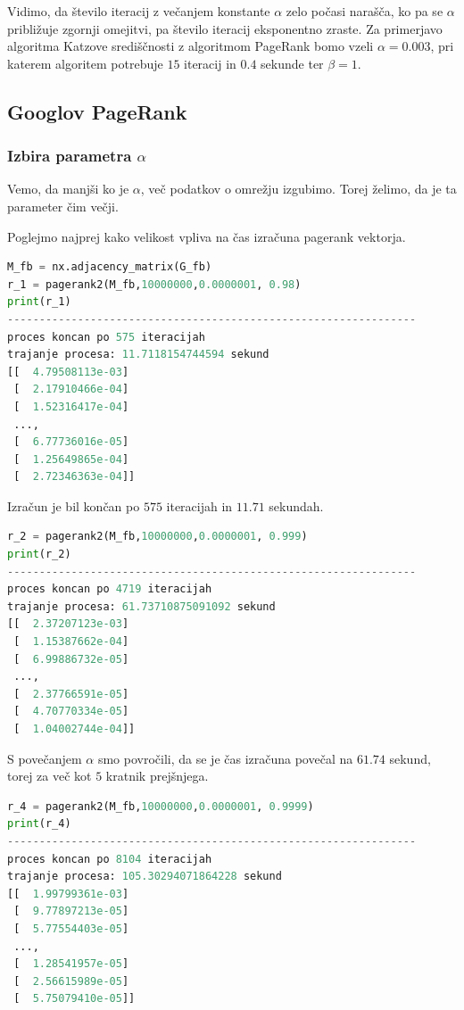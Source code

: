 \documentclass[12pt,a4paper]{amsart}
\begin{document}
Vidimo, da število iteracij z večanjem konstante $\alpha$ zelo počasi narašča, ko pa se $\alpha$ približuje zgornji omejitvi, pa število iteracij eksponentno zraste.
Za primerjavo algoritma Katzove središčnosti z algoritmom PageRank bomo vzeli $\alpha = 0.003$, pri katerem algoritem potrebuje $15$ iteracij in $0.4$ sekunde ter $\beta = 1.$
\subsection{Googlov PageRank}
\subsubsection{Izbira parametra $\alpha$} 
Vemo, da manjši ko je $\alpha$, več podatkov o omrežju izgubimo. Torej želimo, da je ta parameter čim večji. 

Poglejmo najprej kako velikost vpliva na čas izračuna pagerank vektorja. 

\begin{lstlisting}[language=Python]
M_fb = nx.adjacency_matrix(G_fb)
r_1 = pagerank2(M_fb,10000000,0.0000001, 0.98)
print(r_1)
----------------------------------------------------------------
proces koncan po 575 iteracijah
trajanje procesa: 11.7118154744594 sekund
[[  4.79508113e-03]
 [  2.17910466e-04]
 [  1.52316417e-04]
 ..., 
 [  6.77736016e-05]
 [  1.25649865e-04]
 [  2.72346363e-04]]
\end{lstlisting}

Izračun je bil končan po $575$ iteracijah in $11.71$ sekundah.

\begin{lstlisting}[language=Python]
r_2 = pagerank2(M_fb,10000000,0.0000001, 0.999)
print(r_2)
----------------------------------------------------------------
proces koncan po 4719 iteracijah
trajanje procesa: 61.73710875091092 sekund
[[  2.37207123e-03]
 [  1.15387662e-04]
 [  6.99886732e-05]
 ..., 
 [  2.37766591e-05]
 [  4.70770334e-05]
 [  1.04002744e-04]]
\end{lstlisting}
S povečanjem $\alpha$ smo povročili, da se je čas izračuna povečal na $61.74$ sekund, torej za več kot $5$ kratnik prejšnjega. 

\begin{lstlisting}[language=Python]
r_4 = pagerank2(M_fb,10000000,0.0000001, 0.9999)
print(r_4)
----------------------------------------------------------------
proces koncan po 8104 iteracijah
trajanje procesa: 105.30294071864228 sekund
[[  1.99799361e-03]
 [  9.77897213e-05]
 [  5.77554403e-05]
 ..., 
 [  1.28541957e-05]
 [  2.56615989e-05]
 [  5.75079410e-05]]
\end{lstlisting}
\end{document}
